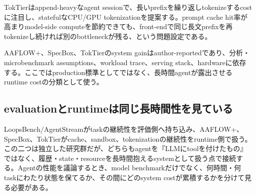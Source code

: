 TokTierはappend-heavyなagent sessionで、長いprefixを繰り返しtokenizeするcostに注目し、statefulなCPU/GPU tokenizationを提案する。prompt cache hit率が高まりmodel-side computeを節約できても、front-endで同じ長文prefixを再tokenizeし続ければ別のbottleneckが残る、という問題設定である。\autocite{src-6513817b493c}


\begin{claimboundary}
AAFLOW+、SpecBox、TokTierのsystem gainはauthor-reportedであり、分析・microbenchmark assumptions、workload trace、serving stack、hardwareに依存する。ここではproduction標準としてではなく、長時間agentが露出させるruntime costの分類として使う。\autocite{src-2266222d4bb7,src-4051106eaef3,src-6513817b493c}
\end{claimboundary}

\subsection{evaluationとruntimeは同じ長時間性を見ている}

LoopsBench/AgentStreamがtaskの継続性を評価側へ持ち込み、AAFLOW+、SpecBox、TokTierがcache、sandbox、tokenizationの継続性をruntime側で扱う。この二つは独立した研究群だが、どちらもagentを『LLMにtoolを付けたもの』ではなく、履歴・state・resourceを長時間抱えるsystemとして扱う点で接続する。Agentの性能を議論するとき、model benchmarkだけでなく、何時間・何taskにわたり状態を保てるか、その間にどのsystem costが累積するかを分けて見る必要がある。\autocite{src-4051106eaef3,src-4141dfcd9b12,src-6513817b493c}
